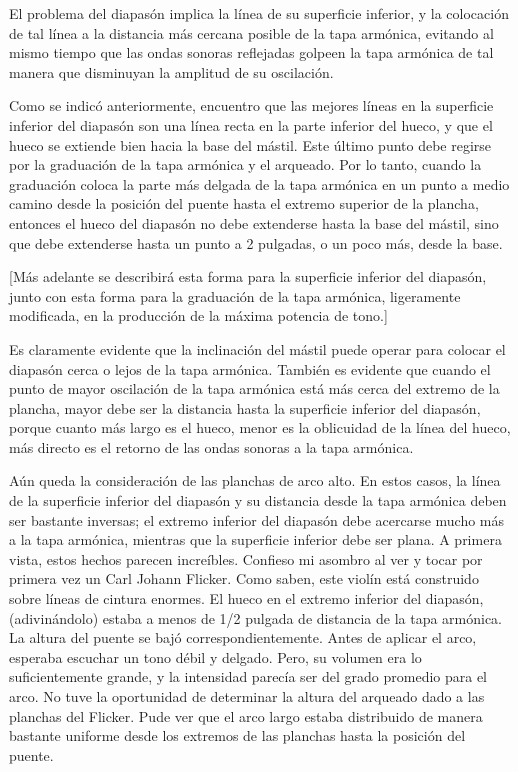 \documentclass[12pt]{book}
\begin{document}
El problema del diapasón implica la línea de su superficie inferior, y la colocación de tal línea a la distancia más cercana posible de la tapa armónica, evitando al mismo tiempo que las ondas sonoras reflejadas golpeen la tapa armónica de tal manera que disminuyan la amplitud de su oscilación.

Como se indicó anteriormente, encuentro que las mejores líneas en la superficie inferior del diapasón son una línea recta en la parte inferior del hueco, y que el hueco se extiende bien hacia la base del mástil. Este último punto debe regirse por la graduación de la tapa armónica y el arqueado. Por lo tanto, cuando la graduación coloca la parte más delgada de la tapa armónica en un punto a medio camino desde la posición del puente hasta el extremo superior de la plancha, entonces el hueco del diapasón no debe extenderse hasta la base del mástil, sino que debe extenderse hasta un punto a 2 pulgadas, o un poco más, desde la base.

[Más adelante se describirá esta forma para la superficie inferior del diapasón, junto con esta forma para la graduación de la tapa armónica, ligeramente modificada, en la producción de la máxima potencia de tono.]

Es claramente evidente que la inclinación del mástil puede operar para colocar el diapasón cerca o lejos de la tapa armónica. También es evidente que cuando el punto de mayor oscilación de la tapa armónica está más cerca del extremo de la plancha, mayor debe ser la distancia hasta la superficie inferior del diapasón, porque cuanto más largo es el hueco, menor es la oblicuidad de la línea del hueco, más directo es el retorno de las ondas sonoras a la tapa armónica.

Aún queda la consideración de las planchas de arco alto. En estos casos, la línea de la superficie inferior del diapasón y su distancia desde la tapa armónica deben ser bastante inversas; el extremo inferior del diapasón debe acercarse mucho más a la tapa armónica, mientras que la superficie inferior debe ser plana. A primera vista, estos hechos parecen increíbles. Confieso mi asombro al ver y tocar por primera vez un Carl Johann Flicker. Como saben, este violín está construido sobre líneas de cintura enormes. El hueco en el extremo inferior del diapasón, (adivinándolo) estaba a menos de 1/2 pulgada de distancia de la tapa armónica. La altura del puente se bajó correspondientemente. Antes de aplicar el arco, esperaba escuchar un tono débil y delgado. Pero, su volumen era lo suficientemente grande, y la intensidad parecía ser del grado promedio para el arco. No tuve la oportunidad de determinar la altura del arqueado dado a las planchas del Flicker. Pude ver que el arco largo estaba distribuido de manera bastante uniforme desde los extremos de las planchas hasta la posición del puente.
\end{document}
